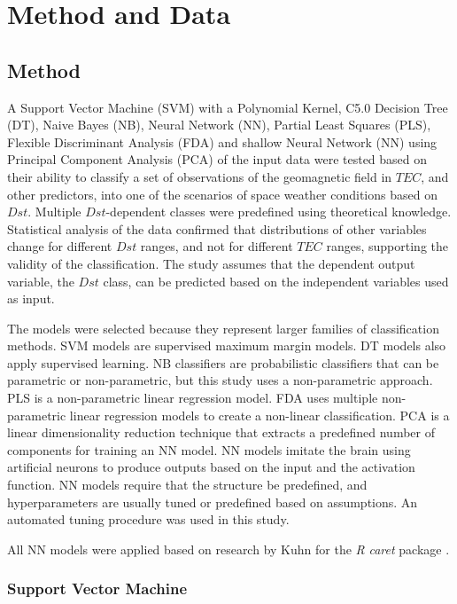 \documentclass[sn-mathphys-num]{sn-jnl}%
\begin{document}
\section{Method and Data}
\label{sec:Dataset}

\subsection{Method}

A Support Vector Machine (SVM) with a Polynomial Kernel, C5.0 Decision Tree (DT), Naive Bayes (NB), Neural Network (NN), Partial Least Squares (PLS), Flexible Discriminant Analysis (FDA) and shallow Neural Network (NN) using Principal Component Analysis (PCA) of the input data were tested based on their ability to classify a set of observations of the geomagnetic field in $TEC$, and other predictors, into one of the scenarios of space weather conditions based on $Dst$. Multiple $Dst$-dependent classes were predefined using theoretical knowledge. Statistical analysis of the data confirmed that distributions of other variables change for different $Dst$ ranges, and not for different $TEC$ ranges, supporting the validity of the classification. The study assumes that the dependent output variable, the $Dst$ class, can be predicted based on the independent variables used as input.

The models were selected because they represent larger families of classification methods. SVM models are supervised maximum margin models. DT models also apply supervised learning. NB classifiers are probabilistic classifiers that can be parametric or non-parametric, but this study uses a non-parametric approach. PLS is a non-parametric linear regression model. FDA uses multiple non-parametric linear regression models to create a non-linear classification. PCA is a linear dimensionality reduction technique that extracts a predefined number of components for training an NN model. NN models imitate the brain using artificial neurons to produce outputs based on the input and the activation function. NN models require that the structure be predefined, and hyperparameters are usually tuned or predefined based on assumptions. An automated tuning procedure was used in this study.

All NN models were applied based on research by Kuhn for the \textit{R} \textit{caret} package \cite{kuhn2013applied, KuhnCaret2024, rprojectProjectStatistical}.

\subsubsection{Support Vector Machine}
\end{document}
